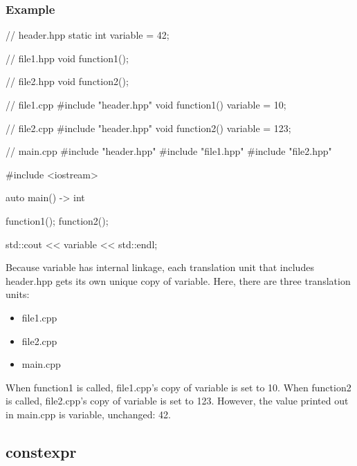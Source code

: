 \documentclass{report}
\begin{document}
\begin{concept}
    \subsubsection{Example}
    \bigbreak \noindent 
    \begin{cppcode}
        // header.hpp
        static int variable = 42;

        // file1.hpp
        void function1();

        // file2.hpp
        void function2();

        // file1.cpp
        #include "header.hpp"
        void function1() { variable = 10; }

        // file2.cpp
        #include "header.hpp"
        void function2() { variable = 123; }

        // main.cpp
        #include "header.hpp"
        #include "file1.hpp"
        #include "file2.hpp"

        #include <iostream>

        auto main() -> int
        {
            function1();
            function2();

            std::cout << variable << std::endl;
        }
    \end{cppcode}
    \bigbreak \noindent 
    Because variable has internal linkage, each translation unit that includes header.hpp gets its own unique copy of variable. Here, there are three translation units:
    \begin{itemize}
        \item file1.cpp
        \item file2.cpp
        \item main.cpp
    \end{itemize}
    When function1 is called, file1.cpp’s copy of variable is set to 10. When function2 is called, file2.cpp’s copy of variable is set to 123. However, the value printed out in main.cpp is variable, unchanged: 42.





















    \pagebreak 
    \bigbreak \noindent 
    \subsection{constexpr}
    \bigbreak \noindent 

\end{concept}
\end{document}
